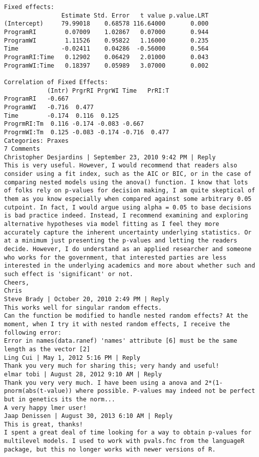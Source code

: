 \begin{framed}
\begin{verbatim}
Fixed effects:
                Estimate Std. Error   t value p.value.LRT
(Intercept)     79.99018    0.68578 116.64000       0.000
ProgramRI        0.07009    1.02867   0.07000       0.944
ProgramWI        1.11526    0.95822   1.16000       0.235
Time            -0.02411    0.04286  -0.56000       0.564
ProgramRI:Time   0.12902    0.06429   2.01000       0.043
ProgramWI:Time   0.18397    0.05989   3.07000       0.002

Correlation of Fixed Effects:
            (Intr) PrgrRI PrgrWI Time   PrRI:T
ProgramRI   -0.667                            
ProgramWI   -0.716  0.477                     
Time        -0.174  0.116  0.125              
ProgrmRI:Tm  0.116 -0.174 -0.083 -0.667       
ProgrmWI:Tm  0.125 -0.083 -0.174 -0.716  0.477
Categories: Praxes
7 Comments
Christopher Desjardins | September 23, 2010 9:42 PM | Reply
This is very useful. However, I would recommend that readers also consider using a fit index, such as the AIC or BIC, or in the case of comparing nested models using the anova() function. I know that lots of folks rely on p-values for decision making, I am quite skeptical of them as you know especially when compared against some arbitrary 0.05 cutpoint. In fact, I would argue using alpha = 0.05 to base decisions is bad practice indeed. Instead, I recommend examining and exploring alternative hypotheses via model fitting as I feel they more accurately capture the inherent uncertainty underlying statistics. Or at a minimum just presenting the p-values and letting the readers decide. However, I do understand as an applied researcher and someone who works for the government, that interested parties are less interested in the underlying academics and more about whether such and such effect is 'significant' or not. 
Cheers,
Chris
Steve Brady | October 20, 2010 2:49 PM | Reply
This works well for singular random effects.
Can the function be modified to handle nested random effects? At the moment, when I try it with nested random effects, I receive the following error:
Error in names(data.ranef) 'names' attribute [6] must be the same length as the vector [2]
Ling Cui | May 1, 2012 5:16 PM | Reply
Thank you very much for sharing this; very handy and useful!
elmar tobi | August 28, 2012 9:10 AM | Reply
Thank you very very much. I have been using a anova and 2*(1-pnorm(abs(t-value)) where possible. P-values may indeed not be perfect but in genetics its the norm... 
A very happy lmer user!
Jaap Denissen | August 30, 2013 6:10 AM | Reply
This is great, thanks!
I spent a great deal of time looking for a way to obtain p-values for multilevel models. I used to work with pvals.fnc from the languageR package, but this no longer works with newer versions of R.

\end{verbatim}
\end{framed}

